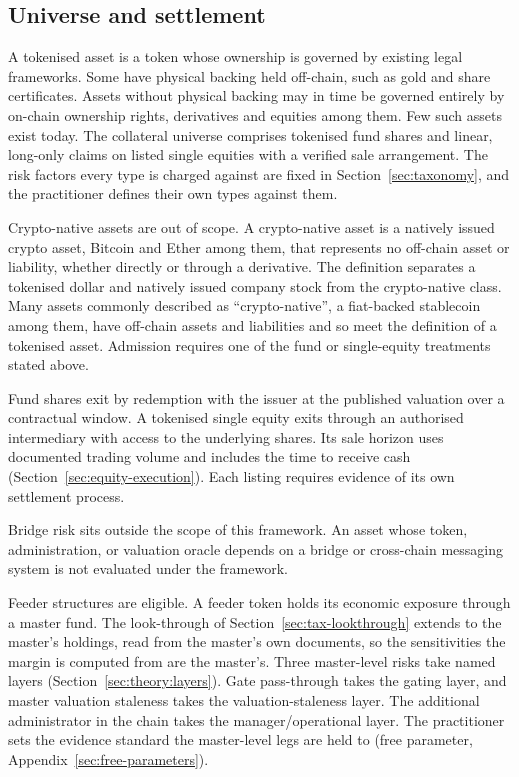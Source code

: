 

\subsection{Universe and settlement}\label{sec:overview-channel}
A tokenised asset is a token whose ownership is governed by existing legal frameworks. Some have physical backing held off-chain, such as gold and share certificates. Assets without physical backing may in time be governed entirely by on-chain ownership rights, derivatives and equities among them. Few such assets exist today. The collateral universe comprises tokenised fund shares and linear, long-only claims on listed single equities with a verified sale arrangement. The risk factors every type is charged against are fixed in Section~\ref{sec:taxonomy}, and the practitioner defines their own types against them.

Crypto-native assets are out of scope. A crypto-native asset is a natively issued crypto asset, Bitcoin and Ether among them, that represents no off-chain asset or liability, whether directly or through a derivative. The definition separates a tokenised dollar and natively issued company stock from the crypto-native class. Many assets commonly described as ``crypto-native'', a fiat-backed stablecoin among them, have off-chain assets and liabilities and so meet the definition of a tokenised asset. Admission requires one of the fund or single-equity treatments stated above.

Fund shares exit by redemption with the issuer at the published valuation over a contractual window. A tokenised single equity exits through an authorised intermediary with access to the underlying shares. Its sale horizon uses documented trading volume and includes the time to receive cash (Section~\ref{sec:equity-execution}). Each listing requires evidence of its own settlement process.

Bridge risk sits outside the scope of this framework. An asset whose token, administration, or valuation oracle depends on a bridge or cross-chain messaging system is not evaluated under the framework.

Feeder structures are eligible. A feeder token holds its economic exposure through a master fund. The look-through of Section~\ref{sec:tax-lookthrough} extends to the master's holdings, read from the master's own documents, so the sensitivities the margin is computed from are the master's. Three master-level risks take named layers (Section~\ref{sec:theory:layers}). Gate pass-through takes the gating layer, and master valuation staleness takes the valuation-staleness layer. The additional administrator in the chain takes the manager/operational layer. The practitioner sets the evidence standard the master-level legs are held to (free parameter, Appendix~\ref{sec:free-parameters}).

